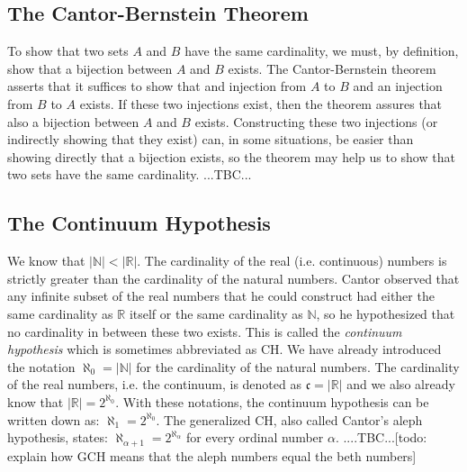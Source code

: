 
\subsection{The Cantor-Bernstein Theorem}
To show that two sets $A$ and $B$ have the same cardinality, we must, by definition, show that a bijection between $A$ and $B$ exists. The Cantor-Bernstein theorem asserts that it suffices to show that and injection from $A$ to $B$ and an injection from $B$ to $A$ exists. If these two injections exist, then the theorem assures that also a bijection between $A$ and $B$ exists. Constructing these two injections (or indirectly showing that they exist) can, in some situations, be easier than showing directly that a bijection exists, so the theorem may help us to show that two sets have the same cardinality. ...TBC...



\subsection{The Continuum Hypothesis}
We know that $|\mathbb{N}| < |\mathbb{R}|$. The cardinality of the real (i.e. continuous) numbers is strictly greater than the cardinality of the natural numbers. Cantor observed that any infinite subset of the real numbers that he could construct had either the same cardinality as $\mathbb{R}$ itself or the same cardinality as $\mathbb{N}$, so he hypothesized that no cardinality in between these two exists. This is called the \emph{continuum hypothesis} which is sometimes abbreviated as CH. We have already introduced the notation $\aleph_0 = |\mathbb{N}|$ for the cardinality of the natural numbers. The cardinality of the real numbers, i.e. the continuum, is denoted as $\mathfrak{c} = |\mathbb{R}|$ and we also already know that $|\mathbb{R}| = 2^{\aleph_0}$. With these notations, the continuum hypothesis can be written down as: $\aleph_1 = 2^{\aleph_0}$. The generalized CH, also called Cantor's aleph hypothesis, states: $\aleph_{\alpha+1} = 2^{\aleph_{\alpha}}$ for every ordinal number $\alpha$. ....TBC...[todo: explain how GCH means that the aleph numbers equal the beth numbers]

